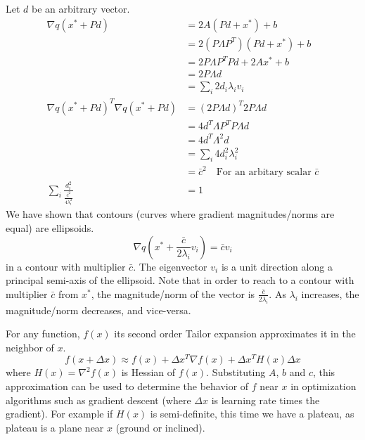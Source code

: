 \documentclass{book}
\numberwithin{equation}{subsection}
\begin{document}
Let $d$ be an arbitrary vector.
\begin{align}
    \nabla q(x^* + Pd) &= 2A(Pd + x^*)+b\\
    &= 2(P\Lambda P^T)(Pd + x^*)+b\\
    &= 2P\Lambda P^TPd + 2Ax^*+b\\
    &= 2P\Lambda d\\
    &= \sum_i 2d_i\lambda_i v_i\\
    \nabla q(x^*+Pd)^T \nabla q(x^*+Pd) &= (2P\Lambda d)^T2P\Lambda d\\
    &= 4d^T\Lambda P^TP\Lambda d\\
    &= 4d^T\Lambda^2 d\\
    &= \sum_i 4d_i^2  \lambda_i^2\\
    &= \bar{c}^2 \quad \text{For an arbitary scalar $\bar{c}$}\\
    \sum_i \frac{d_i^2}{\frac{\bar{c}^2}{4\lambda_i^2}} &= 1
\end{align}
We have shown that contours (curves where gradient magnitudes/norms are equal) are ellipsoids.
\begin{equation}
    \nabla q(x^* + \frac{\bar{c}}{2\lambda_i}v_i) = \bar{c}v_i
\end{equation}
in a contour with multiplier $\bar{c}$. The eigenvector $v_i$ is a unit direction along a principal semi-axis of the ellipsoid. Note that in order to reach to a contour with multiplier $\bar{c}$ from $x^*$, the magnitude/norm of the vector is $\frac{\bar{c}}{2\lambda_i}$. As $\lambda_i$ increases, the magnitude/norm decreases, and vice-versa.

For any function, $f(x)$ its second order Tailor expansion approximates it in the neighbor of $x$.
\begin{equation}
    f(x+\Delta x) \approx f(x)+\Delta x^T\nabla f(x)+\Delta x^TH(x)\Delta x
\end{equation}
where $H(x) = \nabla^2f(x)$ is Hessian of $f(x)$. Substituting $A$, $b$ and $c$, this approximation can be used to determine the behavior of $f$ near $x$ in optimization algorithms such as gradient descent (where $\Delta x$ is learning rate times the gradient). For example if $H(x)$ is semi-definite, this time we have a plateau, as plateau is a plane near $x$ (ground or inclined).
\end{document}
